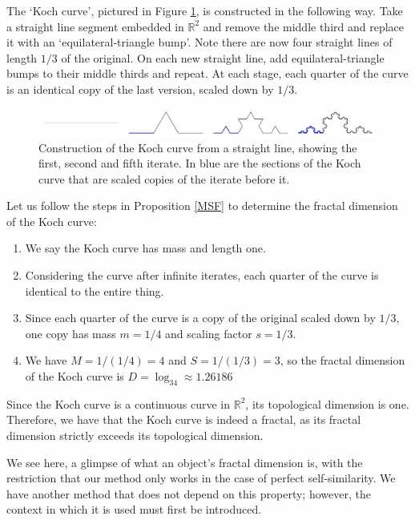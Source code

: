\begin{exmp}
    The `Koch curve', pictured in Figure \ref{fig:Koch}, is constructed in the following way. Take a straight line segment embedded in $\mathbb{R}^2$ and remove the middle third and replace it with an `equilateral-triangle bump'. Note there are now four straight lines of length $1/3$ of the original. On each new straight line, add equilateral-triangle bumps to their middle thirds and repeat. At each stage, each quarter of the curve is an identical copy of the last version, scaled down by $1/3$.
    \begin{figure}
        \centering
        \includegraphics[width=1\linewidth]{Images/Koch new.png}
        \caption{Construction of the Koch curve from a straight line, showing the first, second and fifth iterate. In blue are the sections of the Koch curve that are scaled copies of the iterate before it.}
        \label{fig:Koch}
    \end{figure}
    Let us follow the steps in Proposition \ref{MSF} to determine the fractal dimension of the Koch curve:
    \begin{enumerate}
        \item We say the Koch curve has mass and length one.
        \item Considering the curve after infinite iterates, each quarter of the curve is identical to the entire thing.
        \item Since each quarter of the curve is a copy of the original scaled down by $1/3$, one copy has mass $m=1/4$ and scaling factor $s=1/3$.
        \item We have $M=1/(1/4)=4$ and $S=1/(1/3)=3$, so the fractal dimension of the Koch curve is $D=\log_34\approx1.26186$
    \end{enumerate}
    Since the Koch curve is a continuous curve in $\mathbb{R}^2$, its topological dimension is one. Therefore, we have that the Koch curve is indeed a fractal, as its fractal dimension strictly exceeds its topological dimension.
\end{exmp}
We see here, a glimpse of what an object's fractal dimension is, with the restriction that our method only works in the case of perfect self-similarity. We have another method that does not depend on this property; however, the context in which it is used must first be introduced.
